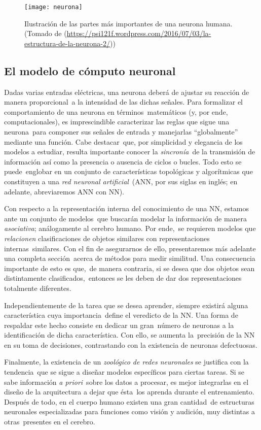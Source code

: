 \begin{figure}[H]
  \centering
  \texttt{[image: neurona]}
  \caption{Ilustración de las partes más importantes de una neurona humana.
    (Tomado de (\url{https://psi121f.wordpress.com/2016/07/03/la-estructura-de-la-neurona-2/}))}
\end{figure}


\subsection{El modelo de cómputo neuronal}

\noindent
Dadas varias entradas eléctricas, una neurona deberá de ajustar su reacción de manera proporcional\
a la intensidad de las dichas señales. Para formalizar el comportamiento de una neurona en términos\
matemáticos (y, por ende, computacionales), es imprescindible caracterizar las reglas que sigue una neurona\
para componer sus señales de entrada y manejarlas ``globalmente'' mediante una función. Cabe destacar\
que, por simplicidad y elegancia de los modelos a estudiar, resulta importante conocer la \emph{sincronía}\
de la transmisión de información así como la presencia o ausencia de ciclos o bucles. Todo esto se puede\
englobar en un conjunto de características topológicas y algorítmicas que constituyen a una \emph{red neuronal artificial}\
(ANN, por sus siglas en inglés; en adelante, abreviaremos ANN con NN).\par
Con respecto a la representación interna del conocimiento de una NN, estamos ante un conjunto de modelos\
que buscarán modelar la información de manera \emph{asociativa}; análogamente al cerebro humano. Por ende,\
se requieren modelos que \emph{relacionen} clasificaciones de objetos similares con representaciones internas\
similares. Con el fin de asegurarnos de ello, presentaremos más adelante una completa sección\
acerca de métodos para medir similitud. Una consecuencia importante de esto es que,\
de manera contraria, si se desea que dos objetos sean distintamente clasificados,\
entonces se les deben de dar dos representaciones totalmente diferentes.\par
Independientemente de la tarea que se desea aprender, siempre existirá alguna característica cuya importancia\
define el veredicto de la NN. Una forma de respaldar este hecho consiste en dedicar un gran\
número de neuronas a la identificación de dicha característica. Con ello, se aumenta la\
precisión de la NN en su toma de decisiones, contrastando con la existencia de neuronas defectuosas.\par
Finalmente, la existencia de un \emph{zoológico de redes neuronales} se justifica con la tendencia\
que se sigue a diseñar modelos específicos para ciertas tareas. Si se sabe información \textit{a priori}\
sobre los datos a procesar, es mejor integrarlas en el diseño de la arquitectura a dejar que ésta\
los aprenda durante el entrenamiento. Después de todo, en el cuerpo humano existen una gran cantidad\
de estructuras neuronales especializadas para funciones como visión y audición, muy distintas a otras\
presentes en el cerebro.

